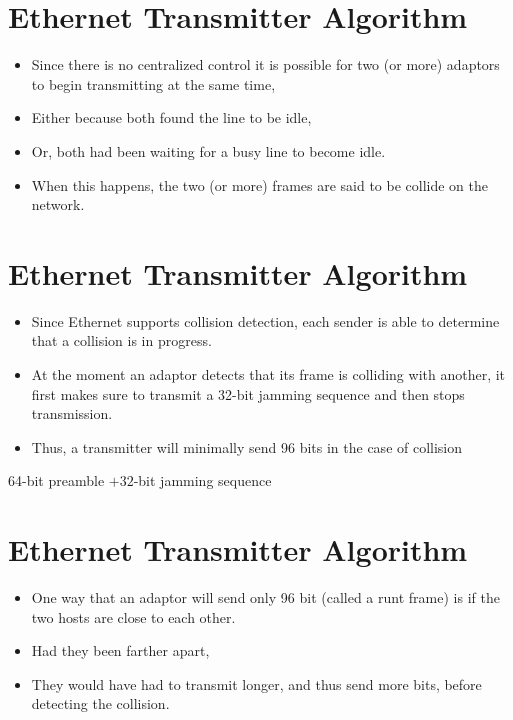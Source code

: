\documentclass[10pt]{article}
\begin{document}
\section{Ethernet Transmitter Algorithm}
\begin{itemize}
  \item Since there is no centralized control it is possible for two (or more) adaptors to begin transmitting at the same time,

  \item Either because both found the line to be idle,

  \item Or, both had been waiting for a busy line to become idle.

  \item When this happens, the two (or more) frames are said to be collide on the network.

\end{itemize}

\section{Ethernet Transmitter Algorithm}
\begin{itemize}
  \item Since Ethernet supports collision detection, each sender is able to determine that a collision is in progress.

  \item At the moment an adaptor detects that its frame is colliding with another, it first makes sure to transmit a 32-bit jamming sequence and then stops transmission.

  \item Thus, a transmitter will minimally send 96 bits in the case of collision

\end{itemize}

64-bit preamble $+32$-bit jamming sequence

\section{Ethernet Transmitter Algorithm}
\begin{itemize}
  \item One way that an adaptor will send only 96 bit (called a runt frame) is if the two hosts are close to each other.

  \item Had they been farther apart,

  \item They would have had to transmit longer, and thus send more bits, before detecting the collision.

\end{itemize}
\end{document}
